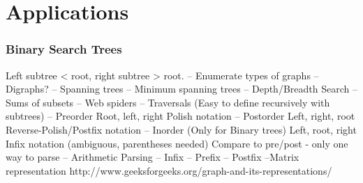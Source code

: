 \documentclass[a4paper,10pt]{report}
\begin{document}
\chapter{Applications}
\subsection{Binary Search Trees}
Left subtree < root, right subtree > root.
-- Enumerate types of graphs
	-- Digraphs?
 -- Spanning trees
	-- Minimum spanning trees
 -- Depth/Breadth Search
	-- Sums of subsets
	-- Web spiders
 -- Traversals (Easy to define recursively with subtrees)
	-- Preorder
		Root, left, right
		Polish notation
	-- Postorder
		Left, right, root
		Reverse-Polish/Postfix notation
	-- Inorder (Only for Binary trees)
		Left, root, right
		Infix notation (ambiguous, parentheses needed)
			Compare to pre/post - only one way to parse
-- Arithmetic Parsing
	-- Infix
	-- Prefix
	-- Postfix
--Matrix representation
http://www.geeksforgeeks.org/graph-and-its-representations/








%
%
\end{document}
